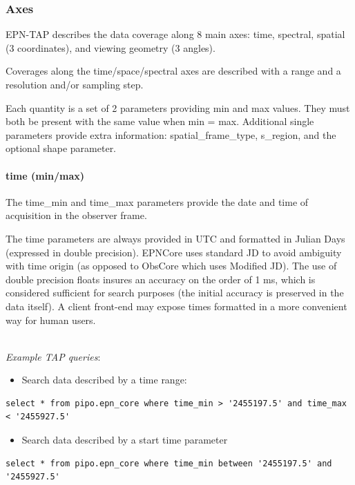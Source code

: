 \documentclass[11pt,a4paper]{ivoa}
\begin{document}
\subsubsection{Axes}

EPN-TAP describes the data coverage along 8 main axes:
time, spectral, spatial (3 coordinates), and viewing geometry (3 angles).

Coverages along the time/space/spectral axes are described with a range
and a resolution and/or sampling step.

Each quantity is a set of 2 parameters providing min and max values. They
must both be present with the same value when min = max. Additional single
parameters provide extra information: spatial\_frame\_type, s\_region,
and the optional shape parameter.

\paragraph{time (min/max)}

The time\_min and time\_max parameters provide the date and time of
acquisition in the observer frame.

The time parameters are always provided in UTC and formatted in Julian
Days (expressed in double precision). EPNCore uses standard JD to avoid
ambiguity with time origin (as opposed to ObsCore which uses Modified
JD). The use of double precision floats insures an accuracy on the order
of 1 ms, which is considered sufficient for search purposes (the initial
accuracy is preserved in the data itself). A client front-end may expose
times formatted in a more convenient way for human users.

\textbf{\\}
\emph{Example TAP queries}:

\begin{itemize}
\item Search data described by a time range:
\end{itemize}

\begin{verbatim}
select * from pipo.epn_core where time_min > '2455197.5' and time_max < '2455927.5'
\end{verbatim}

\begin{itemize}
\item Search data described by a start time parameter
\end{itemize}

\begin{verbatim}
select * from pipo.epn_core where time_min between '2455197.5' and '2455927.5'
\end{verbatim}
\end{document}
